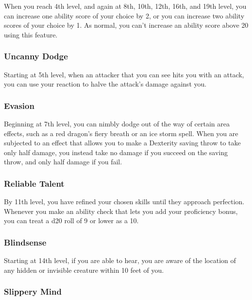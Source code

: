 \documentclass[
]{article}
\begin{document}
When you reach 4th level, and again at 8th, 10th, 12th, 16th, and 19th
level, you can increase one ability score of your choice by 2, or you
can increase two ability scores of your choice by 1. As normal, you
can't increase an ability score above 20 using this feature.

\hypertarget{uncanny-dodge}{%
\subsubsection{Uncanny Dodge}\label{uncanny-dodge}}

Starting at 5th level, when an attacker that you can see hits you with
an attack, you can use your reaction to halve the attack's damage
against you.

\hypertarget{evasion}{%
\subsubsection{Evasion}\label{evasion}}

Beginning at 7th level, you can nimbly dodge out of the way of certain
area effects, such as a red dragon's fiery breath or an ice storm spell.
When you are subjected to an effect that allows you to make a Dexterity
saving throw to take only half damage, you instead take no damage if you
succeed on the saving throw, and only half damage if you fail.

\hypertarget{reliable-talent}{%
\subsubsection{Reliable Talent}\label{reliable-talent}}

By 11th level, you have refined your chosen skills until they approach
perfection. Whenever you make an ability check that lets you add your
proficiency bonus, you can treat a d20 roll of 9 or lower as a 10.

\hypertarget{blindsense}{%
\subsubsection{Blindsense}\label{blindsense}}

Starting at 14th level, if you are able to hear, you are aware of the
location of any hidden or invisible creature within 10 feet of you.

\hypertarget{slippery-mind}{%
\subsubsection{Slippery Mind}\label{slippery-mind}}
\end{document}
